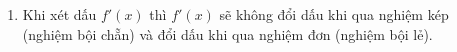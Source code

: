 \begin{note}
\begin{enumerate}[\iconCH]
		\item Khi xét dấu $f'(x)$ thì $f'(x)$ sẽ không đổi dấu khi qua nghiệm kép (nghiệm bội chẵn) và đổi dấu khi qua nghiệm đơn (nghiệm bội lẻ).
	\end{enumerate}
\end{note}

